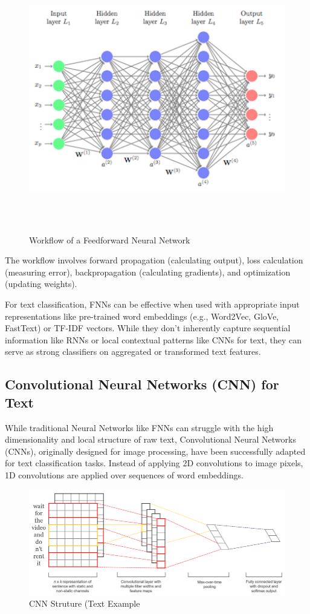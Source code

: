 \begin{figure}[H]
    \centering
    \includegraphics[width=1\linewidth]{images/feedforward_workflow.png}
    \caption{Workflow of a Feedforward Neural Network}
    \label{fig:feedforward_workflow}
\end{figure}

The workflow involves forward propagation (calculating output), loss calculation (measuring error), backpropagation (calculating gradients), and optimization (updating weights).

For text classification, FNNs can be effective when used with appropriate input representations like pre-trained word embeddings (e.g., Word2Vec, GloVe, FastText) or TF-IDF vectors. While they don't inherently capture sequential information like RNNs or local contextual patterns like CNNs for text, they can serve as strong classifiers on aggregated or transformed text features.

\subsection{Convolutional Neural Networks (CNN) for Text}
While traditional Neural Networks like FNNs can struggle with the high dimensionality and local structure of raw text, Convolutional Neural Networks (CNNs), originally designed for image processing, have been successfully adapted for text classification tasks. Instead of applying 2D convolutions to image pixels, 1D convolutions are applied over sequences of word embeddings.

\begin{figure}[h!]
    \centering
    \includegraphics[width=0.75\linewidth]{images/cnn-struture.png}
    \caption{CNN Struture (Text Example}
    \label{fig:enter-label}
\end{figure}

